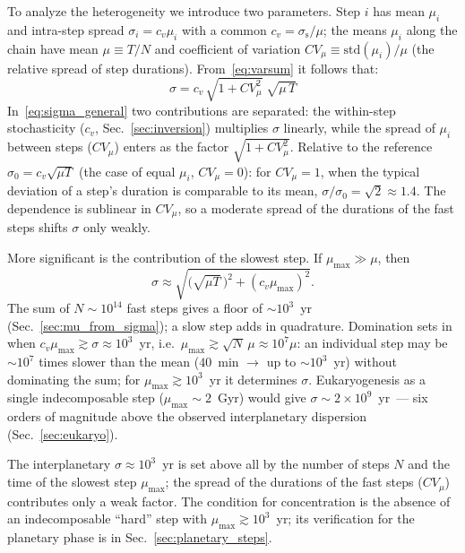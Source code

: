 \documentclass[11pt,a4paper]{article}
\begin{document}
To analyze the heterogeneity we introduce two parameters. Step $i$ has mean $\mu_i$ and intra-step spread $\sigma_i = c_v\mu_i$ with a common $c_v = \sigma_{\mathrm{s}}/\mu$; the means $\mu_i$ along the chain have mean $\mu \equiv T/N$ and coefficient of variation $CV_\mu \equiv \mathrm{std}(\mu_i)/\mu$ (the relative spread of step durations). From~\eqref{eq:varsum} it follows that:
\begin{equation}
\boxed{\;\sigma = c_v\,\sqrt{1+CV_\mu^{2}}\;\sqrt{\mu\,T}\;}
\label{eq:sigma_general}
\end{equation}
In~\eqref{eq:sigma_general} two contributions are separated: the within-step stochasticity ($c_v$, Sec.~\ref{sec:inversion}) multiplies $\sigma$ linearly, while the spread of $\mu_i$ between steps ($CV_\mu$) enters as the factor $\sqrt{1+CV_\mu^2}$. Relative to the reference $\sigma_0=c_v\sqrt{\mu T}$ (the case of equal $\mu_i$, $CV_\mu=0$): for $CV_\mu=1$, when the typical deviation of a step's duration is comparable to its mean, $\sigma/\sigma_0=\sqrt{2}\approx1.4$. The dependence is sublinear in $CV_\mu$, so a moderate spread of the durations of the fast steps shifts $\sigma$ only weakly.

More significant is the contribution of the slowest step. If $\mu_{\max}\gg\mu$, then
\begin{equation}
\sigma \approx \sqrt{\big(\sqrt{\mu T}\,\big)^2 + (c_v\mu_{\max})^2}.
\end{equation}
The sum of $N\sim10^{14}$ fast steps gives a floor of $\sim10^3$~yr (Sec.~\ref{sec:mu_from_sigma}); a slow step adds in quadrature. Domination sets in when $c_v\mu_{\max}\gtrsim\sigma\approx10^3$~yr, i.e.\ $\mu_{\max}\gtrsim\sqrt{N}\,\mu\approx10^{7}\mu$: an individual step may be $\sim10^{7}$ times slower than the mean ($40$~min $\to$ up to $\sim10^3$~yr) without dominating the sum; for $\mu_{\max}\gtrsim10^3$~yr it determines $\sigma$. Eukaryogenesis as a single indecomposable step ($\mu_{\max}\sim2$~Gyr) would give $\sigma\sim2\times10^9$~yr~--- six orders of magnitude above the observed interplanetary dispersion (Sec.~\ref{sec:eukaryo}).

The interplanetary $\sigma\approx10^3$~yr is set above all by the number of steps $N$ and the time of the slowest step $\mu_{\max}$; the spread of the durations of the fast steps ($CV_\mu$) contributes only a weak factor. The condition for concentration is the absence of an indecomposable ``hard'' step with $\mu_{\max}\gtrsim10^3$~yr; its verification for the planetary phase is in Sec.~\ref{sec:planetary_steps}.
\end{document}
